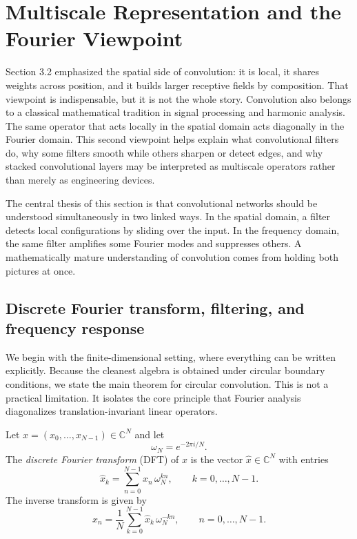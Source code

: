 \section{Multiscale Representation and the Fourier Viewpoint}

Section 3.2 emphasized the spatial side of convolution:
it is local,
it shares weights across position,
and it builds larger receptive fields by composition.
That viewpoint is indispensable, but it is not the whole story.
Convolution also belongs to a classical mathematical tradition in signal processing and harmonic analysis.
The same operator that acts locally in the spatial domain acts diagonally in the Fourier domain.
This second viewpoint helps explain what convolutional filters do,
why some filters smooth while others sharpen or detect edges,
and why stacked convolutional layers may be interpreted as multiscale operators rather than merely as engineering devices.

\medskip

The central thesis of this section is that convolutional networks should be understood simultaneously in two linked ways.
In the spatial domain, a filter detects local configurations by sliding over the input.
In the frequency domain, the same filter amplifies some Fourier modes and suppresses others.
A mathematically mature understanding of convolution comes from holding both pictures at once.

\subsection*{Discrete Fourier transform, filtering, and frequency response}

We begin with the finite-dimensional setting, where everything can be written explicitly.
Because the cleanest algebra is obtained under circular boundary conditions, we state the main theorem for circular convolution.
This is not a practical limitation.
It isolates the core principle that Fourier analysis diagonalizes translation-invariant linear operators.

\begin{definition}
Let $x=(x_0,\dots,x_{N-1}) \in \mathbb{C}^N$ and let
\[
\omega_N = e^{-2\pi i/N}.
\]
The \emph{discrete Fourier transform} (DFT) of $x$ is the vector $\widehat{x} \in \mathbb{C}^N$ with entries
\[
\widehat{x}_k = \sum_{n=0}^{N-1} x_n\, \omega_N^{kn},
\qquad k=0,\dots,N-1.
\]
The inverse transform is given by
\[
 x_n = \frac{1}{N}\sum_{k=0}^{N-1} \widehat{x}_k\, \omega_N^{-kn},
 \qquad n=0,\dots,N-1.
\]
\end{definition}

